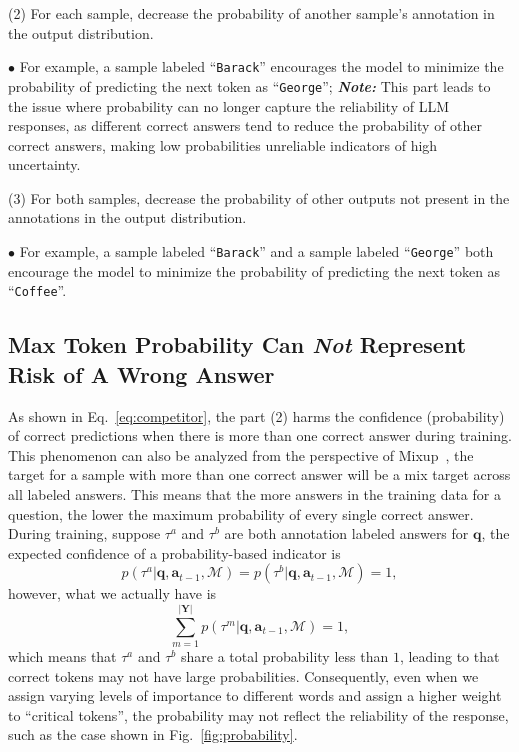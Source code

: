 (2) For each sample, decrease the probability of another sample's annotation in the output distribution.

$\bullet$ For example, a sample labeled ``\texttt{Barack}'' encourages the model to minimize the probability of predicting the next token as ``\texttt{George}''; \textit{\textbf{Note:}} This part leads to the issue where probability can no longer capture the reliability of LLM responses, as different correct answers tend to reduce the probability of other correct answers, making low probabilities unreliable indicators of high uncertainty.

(3) For both samples, decrease the probability of other outputs not present in the annotations in the output distribution. 

$\bullet$ For example, a sample labeled ``\texttt{Barack}'' and a sample labeled ``\texttt{George}'' both encourage the model to minimize the probability of predicting the next token as ``\texttt{Coffee}''.


\subsection{Max Token Probability Can \textit{Not} Represent Risk of A Wrong Answer}
As shown in Eq.~\ref{eq:competitor}, the part (2) harms the confidence (probability) of correct predictions when there is more than one correct answer during training. This phenomenon can also be analyzed from the perspective of Mixup~\cite{zhang2017mixup}, the target for a sample with more than one correct answer will be a mix target across all labeled answers. This means that the more answers in the training data for a question, the lower the maximum probability of every single correct answer. During training, suppose $\tau^{a}$ and $\tau^{b}$ are both annotation labeled answers for $\bm{q}$, the expected confidence of a probability-based indicator is
\begin{equation}
p(\tau^{a}|\bm{q},\bm{a}_{t-1},\mathcal{M})=p(\tau^{b}|\bm{q},\bm{a}_{t-1},\mathcal{M}) = 1,
\end{equation}
however, what we actually have is 
\begin{equation}
\sum_{m=1}^{|\bm{Y}|}p(\tau^{m}|\bm{q},\bm{a}_{t-1},\mathcal{M}) = 1,\label{eq:mixup}
\end{equation}
which means that $\tau^{a}$ and $\tau^{b}$ share a total probability less than $1$, leading to that correct tokens may not have large probabilities. Consequently, even when we assign varying levels of importance to different words and assign a higher weight to ``critical tokens'', the probability may not reflect the reliability of the response, such as the case shown in Fig.~\ref{fig:probability}.

